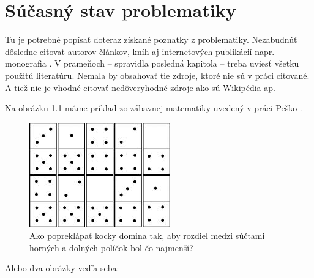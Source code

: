 \chapter{Súčasný stav problematiky}

Tu je potrebné popísať doteraz získané poznatky z problematiky. 
Nezabudnúť dôsledne citovať autorov článkov, kníh aj internetových publikácií 
napr. monografia \cite{berman}. 
V prameňoch -- spravidla posledná kapitola -- treba uviesť všetku použitú literatúru. 
Nemala by obsahovať tie zdroje, ktoré nie sú v práci citované.
A tiež nie je vhodné citovať nedôveryhodné zdroje ako sú Wikipédia ap.

Na obrázku \ref{obr1} máme príklad zo zábavnej matematiky uvedený v práci Peško \cite{pes2}.

\begin{figure}[ht]
\begin{center}
\begin{minipage}{0.7\linewidth}
\begin{center}
\includegraphics[width=.8\textwidth]{domino.jpg}
\caption{Ako popreklápať kocky domina tak, aby rozdiel medzi 
súčtami horných a dolných políčok bol čo najmenší? }
\label{obr1}
\end{center}
\end{minipage}
\end{center}
\end{figure}

Alebo dva obrázky vedľa seba:

